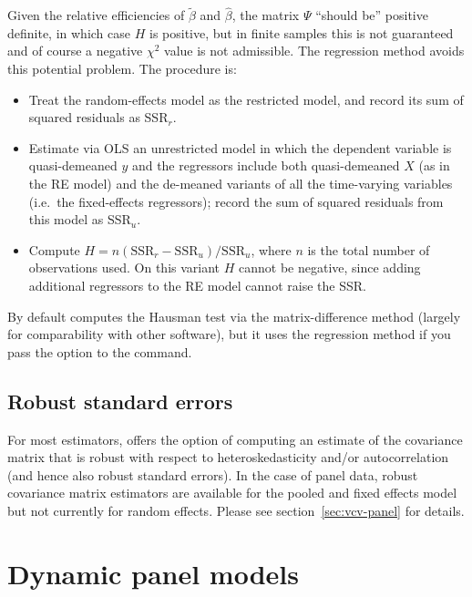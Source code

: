Given the relative efficiencies of $\tilde{\beta}$ and $\hat{\beta}$,
the matrix $\Psi$ ``should be'' positive definite, in which case $H$ is
positive, but in finite samples this is not guaranteed and of course
a negative $\chi^2$ value is not admissible.  The regression method
avoids this potential problem.  The procedure is:
\begin{itemize}
\item Treat the random-effects model as the restricted model, and
  record its sum of squared residuals as SSR$_r$.
\item Estimate via OLS an unrestricted model in which the dependent
  variable is quasi-demeaned $y$ and the regressors include both
  quasi-demeaned $X$ (as in the RE model) and the de-meaned variants
  of all the time-varying variables (i.e.\ the fixed-effects
  regressors); record the sum of squared residuals from this model
  as SSR$_u$.
\item Compute $H = n \left(\mbox{SSR}_r - \mbox{SSR}_u\right) /
  \mbox{SSR}_u$, where $n$ is the total number of observations used.
  On this variant $H$ cannot be negative, since adding additional
  regressors to the RE model cannot raise the SSR.
\end{itemize}

By default  computes the Hausman test via the
matrix-difference method (largely for comparability with other
software), but it uses the regression method if you pass the
option  to the  command.

\subsection{Robust standard errors}
\label{panel-robust}

For most estimators,  offers the option of computing an
estimate of the covariance matrix that is robust with respect to
heteroskedasticity and/or autocorrelation (and hence also robust
standard errors).  In the case of panel data, robust covariance matrix
estimators are available for the pooled and fixed effects model but
not currently for random effects.  Please see
section~\ref{sec:vcv-panel} for details.


\section{Dynamic panel models}
\label{panel-dyn}

